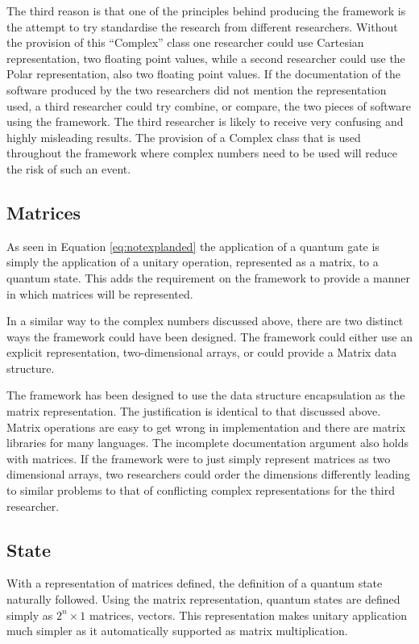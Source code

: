 The third reason is that one of the principles behind producing the framework is the attempt to try standardise the research from different researchers.
Without the provision of this ``Complex'' class one researcher could use Cartesian representation, two floating point values, while a second researcher could use the Polar representation, also two floating point values.
If the documentation of the software produced by the two researchers did not mention the representation used, a third researcher could try combine, or compare, the two pieces of software using the framework.
The third researcher is likely to receive very confusing and highly misleading results.
The provision of a Complex class that is used throughout the framework where complex numbers need to be used will reduce the risk of such an event.

\subsection{Matrices}
As seen in Equation \ref{eq:notexplanded} the application of a quantum gate is simply the application of a unitary operation, represented as a matrix, to a quantum state.
This adds the requirement on the framework to provide a manner in which matrices will be represented.

In a similar way to the complex numbers discussed above, there are two distinct ways the framework could have been designed.
The framework could either use an explicit representation, two-dimensional arrays, or could provide a Matrix data structure.

The framework has been designed to use the data structure encapsulation as the matrix representation.
The justification is identical to that discussed above.
Matrix operations are easy to get wrong in implementation and there are matrix libraries for many languages.
The incomplete documentation argument also holds with matrices.
If the framework were to just simply represent matrices as two dimensional arrays, two researchers could order the dimensions differently leading to similar problems to that of conflicting complex representations for the third researcher.

\subsection{State}
With a representation of matrices defined, the definition of a quantum state naturally followed.
Using the matrix representation, quantum states are defined simply as $2^n\times1$ matrices, vectors.
This representation makes unitary application much simpler as it automatically supported as matrix multiplication.

